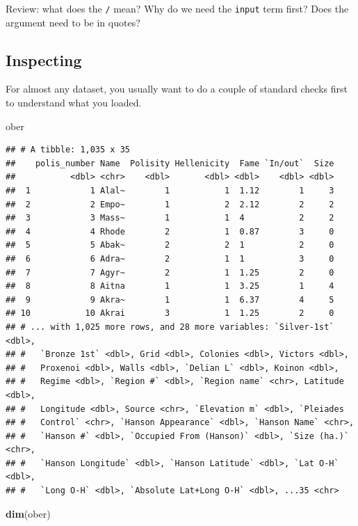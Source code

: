 \documentclass[]{book}
\newenvironment{Shaded}{\begin{snugshade}}{\end{snugshade}}
\newcommand{\KeywordTok}[1]{\textcolor[rgb]{0.13,0.29,0.53}{\textbf{#1}}}
\newcommand{\NormalTok}[1]{#1}
\theoremstyle{definition}
\theoremstyle{definition}
\theoremstyle{definition}
\theoremstyle{remark}
\begin{document}
Review: what does the \texttt{/} mean? Why do we need the \texttt{input} term first? Does the argument need to be in quotes?

\hypertarget{inspecting}{%
\subsection{Inspecting}\label{inspecting}}

For almost any dataset, you usually want to do a couple of standard checks first to understand what you loaded.

\begin{Shaded}
\begin{Highlighting}[]
\NormalTok{ober}
\end{Highlighting}
\end{Shaded}

\begin{verbatim}
## # A tibble: 1,035 x 35
##    polis_number Name  Polisity Hellenicity  Fame `In/out`  Size
##           <dbl> <chr>    <dbl>       <dbl> <dbl>    <dbl> <dbl>
##  1            1 Alal~        1           1  1.12        1     3
##  2            2 Empo~        1           2  2.12        2     2
##  3            3 Mass~        1           1  4           2     2
##  4            4 Rhode        2           1  0.87        3     0
##  5            5 Abak~        2           2  1           2     0
##  6            6 Adra~        2           1  1           3     0
##  7            7 Agyr~        2           1  1.25        2     0
##  8            8 Aitna        1           1  3.25        1     4
##  9            9 Akra~        1           1  6.37        4     5
## 10           10 Akrai        3           1  1.25        2     0
## # ... with 1,025 more rows, and 28 more variables: `Silver-1st` <dbl>,
## #   `Bronze 1st` <dbl>, Grid <dbl>, Colonies <dbl>, Victors <dbl>,
## #   Proxenoi <dbl>, Walls <dbl>, `Delian L` <dbl>, Koinon <dbl>,
## #   Regime <dbl>, `Region #` <dbl>, `Region name` <chr>, Latitude <dbl>,
## #   Longitude <dbl>, Source <chr>, `Elevation m` <dbl>, `Pleiades
## #   Control` <chr>, `Hanson Appearance` <dbl>, `Hanson Name` <chr>,
## #   `Hanson #` <dbl>, `Occupied From (Hanson)` <dbl>, `Size (ha.)` <chr>,
## #   `Hanson Longitude` <dbl>, `Hanson Latitude` <dbl>, `Lat O-H` <dbl>,
## #   `Long O-H` <dbl>, `Absolute Lat+Long O-H` <dbl>, ...35 <chr>
\end{verbatim}

\begin{Shaded}
\begin{Highlighting}[]
\KeywordTok{dim}\NormalTok{(ober)}
\end{Highlighting}
\end{Shaded}
\end{document}
